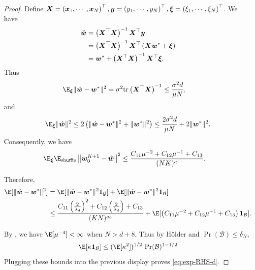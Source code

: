 \begin{proof}
    Define ${\bm{X}}=\left({\bm{x}}_1, \cdots, {\bm{x}}_N\right)^{\top}, {\bm{y}} = \left(y_1, \cdots, y_N\right)^{\top}, \bm\xi = \left(\xi_1, \cdots, \xi_N\right)^{\top}$. We have 
\begin{align}
    \hat{{\bm{w}}} &= \left({\bm{X}}^{\top}{\bm{X}}\right)^{-1}{\bm{X}}^{\top}{\bm{y}} \nonumber \\
    &= \left({\bm{X}}^{\top}{\bm{X}}\right)^{-1}{\bm{X}}^{\top}\left({\bm{X}}{\bm{w}}^*+\bm\xi\right) \nonumber \\
    &={\bm{w}}^*+\left({\bm{X}}^{\top}{\bm{X}}\right)^{-1}{\bm{X}}^{\top}\bm\xi. \label{equ:hat-w}
\end{align}
Thus
\begin{align*}
    \E_{\bm\xi}\|\hat{\vw}-\vw^*\|^2&=\sigma^2\tr\left(\mX^{\top}\mX\right)^{-1}\leq\frac{\sigma^2d}{\mu N},
\end{align*}
and
\begin{align*}
    \E_{\bm\xi}\|\hat{\vw}\|^2\leq 2\left(\|\hat{\vw}-\vw^*\|^2+\|\vw^*\|^2\right)\leq\frac{2\sigma^2d}{\mu N}+2\|\vw^*\|^2.
\end{align*}
Consequently, we have
\begin{align*}
    \E_{\bm\xi}\E_{\text{shuffle}}\left\|\vw_0^{K+1}-\hat{\vw}\right\|^2
    &\le \frac{C_{11}\mu^{-2}+C_{12}\mu^{-1}+C_{13}}{(NK)^{a}}. 
\end{align*}



Therefore,
\begin{align*}
    \E[\|\hat{\vw}-\vw^*\|^2]
&=\E[\|\hat{\vw}-\vw^*\|^2\mathbf 1_{\mathcal G}]+\E[\|\hat{\vw}-\vw^*\|^2\mathbf 1_{\mathcal B}] \\
&\le
\frac{C_{11}\left(\frac{2}{\lambda_d}\right)^{2}+C_{12}\left(\frac{2}{\lambda_d}\right)+C_{13}}
{(KN)^{a_0}}+\E[\left(C_{11}\mu^{-2}+C_{12}\mu^{-1}+C_{13}\right)\mathbf 1_{\mathcal B}].
\end{align*}

By , we have $\E[\mu^{-4}]<\infty$ when $N>d+8$.
Thus by H\"older and $\Pr(\mathcal B)\le \delta_N$,
\[
\E[\kappa\mathbf 1_{\mathcal B}]
\le (\E[\kappa^2])^{1/2}\,\Pr(\mathcal B)^{1-1/2}
\]
Plugging these bounds into the previous display proves \eqref{eq:exp-RHS-d}.
\end{proof}
